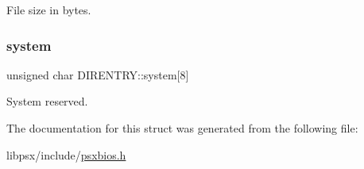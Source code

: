 File size in bytes. 

\mbox{\label{structDIRENTRY_af4a5a4c764708f42c4f4396705e0b461}} 
\subsubsection{\texorpdfstring{system}{system}}
{\footnotesize\ttfamily unsigned char D\+I\+R\+E\+N\+T\+R\+Y\+::system\mbox{[}8\mbox{]}}



System reserved. 



The documentation for this struct was generated from the following file\+:\begin{DoxyCompactItemize}
\item 
libpsx/include/\hyperlink{psxbios_8h}{psxbios.\+h}\end{DoxyCompactItemize}
